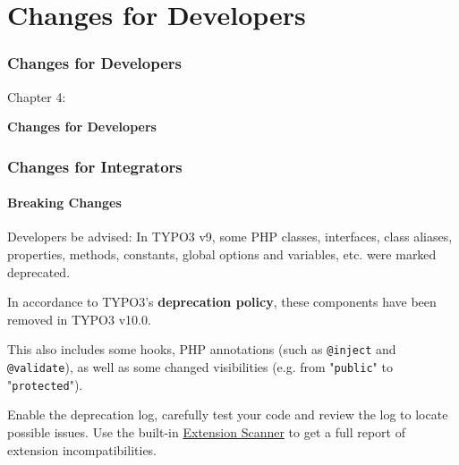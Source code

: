 %

\section{Changes for Developers}
\begin{frame}[fragile]
	\frametitle{Changes for Developers}

	\begin{center}\huge{Chapter 4:}\end{center}
	\begin{center}\huge{\color{typo3darkgrey}\textbf{Changes for Developers}}\end{center}

\end{frame}


\begin{frame}[fragile]
	\frametitle{Changes for Integrators}
	\framesubtitle{Breaking Changes}

	\small
		Developers be advised: In TYPO3 v9, some PHP classes, interfaces, class aliases,
		properties, methods, constants, global options and variables, etc. were marked
		deprecated.

		\vspace{0.2cm}

		In accordance to TYPO3's \textbf{deprecation policy}, these components have
		been removed in TYPO3 v10.0.

		\vspace{0.2cm}

		This also includes some hooks, PHP annotations (such as \texttt{@inject} and
		\texttt{@validate}), as well as some changed visibilities (e.g. from
		"\texttt{public}" to "\texttt{protected}").

		\vspace{0.2cm}

		Enable the deprecation log, carefully test your code and review the log to
		locate possible issues. Use the built-in
		\href{https://docs.typo3.org/m/typo3/reference-coreapi/master/en-us/ApiOverview/ExtensionScanner/Index.html}{Extension Scanner}
		to get a full report of extension incompatibilities.

	\normalsize

\end{frame}

